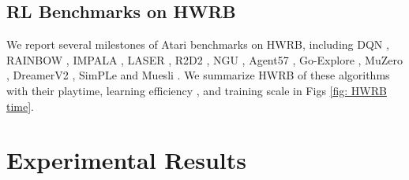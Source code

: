 \documentclass[nohyperref]{article}
\theoremstyle{plain}
\begin{document}
\begin{figure*}[!t]
    \centering
	\centering
	\caption{SOTA algorithms of Atari 57 games on mean and median SABER (\%) and corresponding training scale.}
	\label{fig: scale mean SABER time}
\end{figure*}

\subsection{RL Benchmarks on HWRB}
\label{app: RL Benchmarks on HWRB}


We report several milestones of Atari benchmarks on HWRB, including DQN \citep{dqn}, RAINBOW \citep{rainbow}, IMPALA \citep{impala}, LASER \citep{laser}, R2D2 \citep{r2d2}, NGU \citep{ngu}, Agent57 \citep{agent57}, Go-Explore \citep{goexplore}, MuZero \citep{muzero}, DreamerV2 \citep{dreamerv2}, SimPLe \citep{modelbasedatari} and Muesli \citep{muesli}. We summarize HWRB of these algorithms  with their playtime, learning efficiency , and training scale in Figs \ref{fig: HWRB time}.

\begin{figure*}[!t]
    \centering
	\centering
	\caption{SOTA algorithms of Atari 57 games on HWRB.
	HWRB of SimPLe is 0, so it's not shown in the up-right figure.}
	\label{fig: HWRB time}
\end{figure*}

\clearpage


\section{Experimental Results}
\label{appendix: experiment results}
\end{document}
